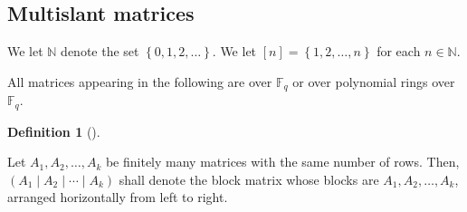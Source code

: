 \documentclass[numbers=enddot,12pt,final,onecolumn,notitlepage]{scrartcl}%
\theoremstyle{definition}
\newtheorem{defi}[theo]{Definition}
\newenvironment{definition}[1][]
{\begin{defi}[#1]\begin{leftbar}}
{\end{leftbar}\end{defi}}
\newenvironment{noncompile}{}{}
\newcommand{\Fq}{\mathbb{F}_q}
\theoremstyle{plainsl}
\begin{document}
\subsection{Multislant matrices}

We let $\mathbb{N}$ denote the set $\left\{  0,1,2,\ldots\right\}  $. We let
$\left[  n\right]  =\left\{  1,2,\ldots,n\right\}  $ for each $n\in\mathbb{N}$.

All matrices appearing in the following are over $\Fq$ or over
polynomial rings over $\Fq$.



\begin{definition}
Let $A_{1},A_{2},\ldots,A_{k}$ be finitely many matrices with the same number
of rows. Then, $\left(  A_{1}\mid A_{2}\mid\cdots\mid A_{k}\right)  $ shall
denote the block matrix whose blocks are $A_{1},A_{2},\ldots,A_{k}$, arranged
horizontally from left to right.
\end{definition}
\end{document}
